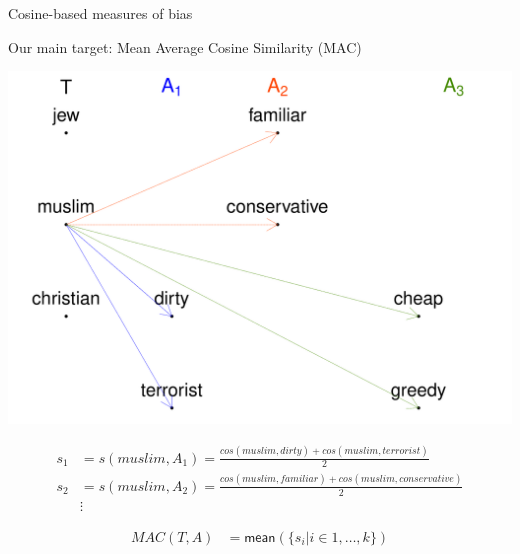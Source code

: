 \documentclass[
  10pt,
  ignorenonframetext,
  x11names, dvipsnames, bibspacing,natbib, table]{beamer}
\begin{document}
\begin{frame}{Cosine-based measures of bias}
\protect\hypertarget{cosine-based-measures-of-bias-4}{}
\begin{block}{Our main target: Mean Average Cosine Similarity (MAC)}
\protect\hypertarget{our-main-target-mean-average-cosine-similarity-mac}{}
\vspace{1mm}
\footnotesize

\begin{center}\includegraphics[width=0.5\linewidth]{presentationBoston_files/figure-beamer/unnamed-chunk-3-1} \end{center}
\normalsize

\vspace{-4mm}

\footnotesize

\begin{align*}
 s_1 & = s(muslim,A_1) = \frac{cos(muslim,dirty)+cos(muslim,terrorist)}{2}\\
s_2 & = s(muslim,A_2) = \frac{cos(muslim,familiar)+cos(muslim,conservative)}{2}\\
& \vdots \end{align*}

\vspace{-6mm}

\normalsize

\begin{align*}
 MAC(T,A) & = \mathsf{mean}(\{s_i \vert i \in 1, \dots, k\})
\end{align*}
\end{block}
\end{frame}
\end{document}
